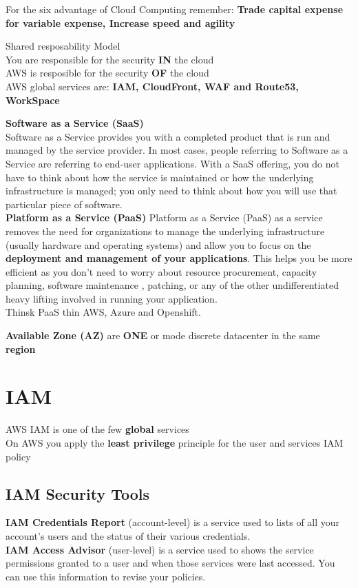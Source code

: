 \documentclass[12pt, letterpaper, twoside]{article}
\begin{document}
For the six advantage of Cloud Computing remember: \textbf{Trade capital expense for variable expense, Increase speed and agility}

Shared resposability Model\\
You are responsible for the security \textbf{IN} the cloud\\
AWS is resposible for the security \textbf{OF} the cloud\\

AWS global services are: \textbf{IAM, CloudFront, WAF and Route53, WorkSpace}

\textbf{Software as a Service (SaaS)}\\
Software as a Service provides you with a completed product that is run and managed by the service provider. 
In most cases, people referring to Software as a Service are referring to end-user applications. 
With a SaaS offering, you do not have to think about how the service is maintained or how the underlying 
infrastructure is managed; you only need to think about how you will use that particular piece of software.\\

\textbf{Platform as a Service (PaaS)}
Platform as a Service (PaaS) as a service removes the need for organizations to manage the underlying infrastructure 
(usually hardware and operating systems) and allow you to focus on the \textbf{deployment and management of your applications}. 
This helps you be more efficient as you don’t need to worry about resource procurement, capacity planning, software maintenance
, patching, or any of the other undifferentiated heavy lifting involved in running your application.\\
Thinsk PaaS thin AWS, Azure and Openshift.

\textbf{Available Zone (AZ)} are \textbf{ONE} or mode discrete datacenter in the same \textbf{region}

\section{IAM}
AWS IAM is one of the few \textbf{global} services\\

On AWS you apply the \textbf{least privilege} principle for the user and services IAM policy

\subsection{IAM Security Tools}
\textbf{IAM Credentials Report} (account-level) is a service used to lists of all your account's users and the status of their various
credentials.\\
\textbf{IAM Access Advisor} (user-level) is a service used to shows the service permissions granted to a user and when those
services were last accessed. You can use this information to revise your policies.\\
\end{document}
